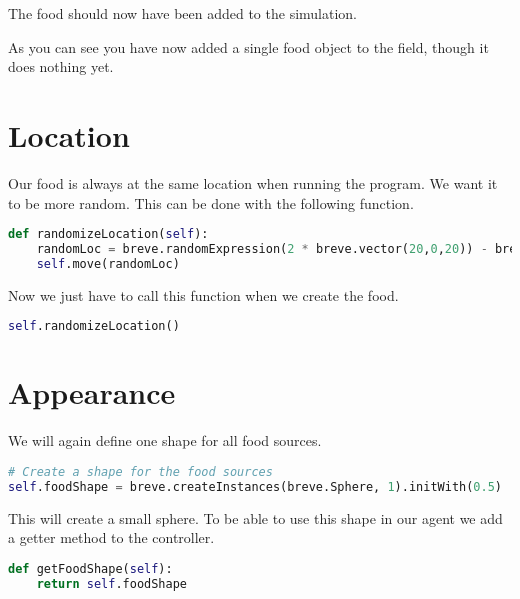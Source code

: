 
The food should now have been added to the simulation.

As you can see you have now added a single food object to the field, though it does nothing yet.

\section{Location}
Our food is always at the same location when running the program. We want it to be more random. This can be done with the following function.
\begin{fullwidth}
\begin{lstlisting}[language=Python]
def randomizeLocation(self):
    randomLoc = breve.randomExpression(2 * breve.vector(20,0,20)) - breve.vector(20,20,20)
    self.move(randomLoc)
\end{lstlisting}
\end{fullwidth}

Now we just have to call this function when we create the food.
\begin{lstlisting}[language=Python]
self.randomizeLocation()
\end{lstlisting}


\section{Appearance}
We will again define one shape for all food sources.

\begin{fullwidth}
\begin{lstlisting}[language=Python]
# Create a shape for the food sources
self.foodShape = breve.createInstances(breve.Sphere, 1).initWith(0.5)
\end{lstlisting}
\end{fullwidth}
This will create a small sphere. To be able to use this shape in our agent we add a getter method to the controller.

\begin{lstlisting}[language=Python]
def getFoodShape(self):
    return self.foodShape
\end{lstlisting}

